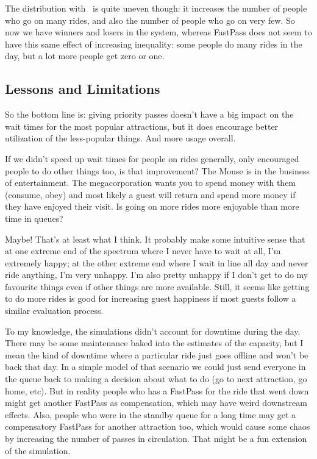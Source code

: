 \documentclass[a4paper]{report}
\begin{document}
The distribution with \FPP~is quite uneven though: it increases the number of people who go on many rides, and also the number of people who go on very few. So now we have winners and losers in the system, whereas FastPass does not seem to have this same effect of increasing inequality: some people do many rides in the day, but a lot more people get zero or one. 

\subsection*{Lessons and Limitations}
So the bottom line is: giving priority passes doesn't have a big impact on the wait times for the most popular attractions, but it does encourage better utilization of the less-popular things. And more usage overall.

If we didn't speed up wait times for people on rides generally, only encouraged people to do other things too, is that improvement? The Mouse is in the business of entertainment. The megacorporation wants you to spend money with them (consume, obey) and most likely a guest will return and spend more money if they have enjoyed their visit. Is going on more rides more enjoyable than more time in queues? 

Maybe! That's at least what I think. It probably make some intuitive sense that at one extreme end of the spectrum where I never have to wait at all, I'm extremely happy; at the other extreme end where I wait in line all day and never ride anything, I'm very unhappy. I'm also pretty unhappy if I don't get to do my favourite things even if other things are more available. Still, it seems like getting to do more rides is good for increasing guest happiness if most guests follow a similar evaluation process. 

To my knowledge, the simulations didn't account for downtime during the day. There may be some maintenance baked into the estimates of the capacity, but I mean the kind of downtime where a particular ride just goes offline and won't be back that day. In a simple model of that scenario we could just send everyone in the queue back to making a decision about what to do (go to next attraction, go home, etc). But in reality people who has a FastPass for the ride that went down might get another FastPass as compensation, which may have weird downstream effects. Also, people who were in the standby queue for a long time may get a compensatory FastPass for another attraction too, which would cause some chaos by increasing the number of passes in circulation. That might be a fun extension of the simulation.
\end{document}
